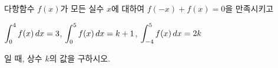 다항함수 $f(x)$가 모든 실수 $x$에 대하여 $f(-x)+f(x)=0$을 만족시키고 \par\smallskip\noindent\hspace*{1.5em}$\displaystyle\int_{0}^{4} f(x)\mkern3mu dx=3$, $\displaystyle\int_{0}^{5} f(x)\mkern3mu dx=k+1$, $\displaystyle\int_{-4}^{5} f(x)\mkern3mu dx=2k$\par\smallskip\noindent 일 때, 상수 $k$의 값을 구하시오.
